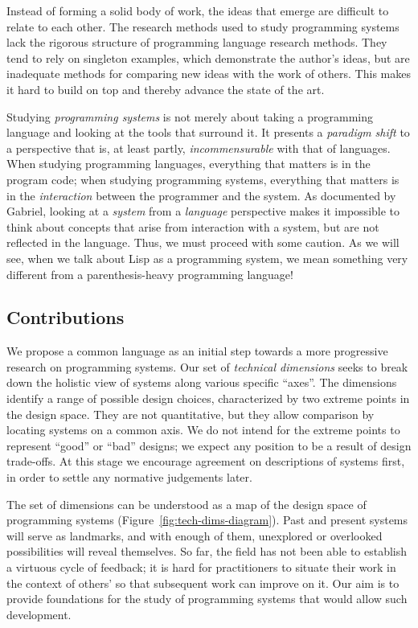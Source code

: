 \documentclass[english,submission]{programming}
\providecommand{\DIFadd}[1]{{\protect\color{blue}\uwave{#1}}} %
\providecommand{\DIFaddbegin}{} %
\providecommand{\DIFaddend}{} %
\begin{document}
Instead of forming a solid body of work, the ideas that emerge are
difficult to relate to each other. The research methods used to study
programming systems lack the rigorous structure of programming language
research methods. They tend to rely on singleton examples, which
demonstrate the author's ideas, but are inadequate methods for comparing
new ideas with the work of others. This makes it hard to build on top
and thereby advance the state of the art.

Studying \emph{programming systems} is not merely about taking a
programming language and looking at the tools that surround it. It
presents a \emph{paradigm shift} to a perspective that is, at least
partly, \emph{incommensurable} with that of languages. When studying
programming languages, everything that matters is in the program code;
when studying programming systems, everything that matters is in the
\emph{interaction} between the programmer and the system. As documented
by Gabriel\DIFaddbegin \DIFadd{~}\DIFaddend \cite{PLrev}, looking at a \emph{system} from a
\emph{language} perspective makes it impossible to think about concepts
that arise from interaction with a system, but are not reflected in the
language. Thus, we must proceed with some caution. As we will see, when
we talk about Lisp as a programming system, we mean something very
different from a parenthesis-heavy programming language!

\hypertarget{contributions}{%
\subsection{Contributions}\label{contributions}}

We propose a common language as an initial step towards a more
progressive research on programming systems. Our set of \emph{technical
dimensions} seeks to break down the holistic view of systems along
various specific ``axes''. The dimensions identify a range of possible
design choices, characterized by two extreme points in the design space.
They are not quantitative, but they allow comparison by locating systems
on a common axis. We do not intend for the extreme points to represent
``good'' or ``bad'' designs; we expect any position to be a result of
design trade-offs. At this stage we encourage agreement on descriptions
of systems first, in order to settle any normative judgements later.

The set of dimensions can be understood as a map of the design space of
programming systems (Figure~\ref{fig:tech-dims-diagram}). Past and
present systems will serve as landmarks, and with enough of them,
unexplored or overlooked possibilities will reveal themselves. So far,
the field has not been able to establish a virtuous cycle of feedback;
it is hard for practitioners to situate their work in the context of
others' so that subsequent work can improve on it. Our aim is to provide
foundations for the study of programming systems that would allow such
development.
\end{document}
